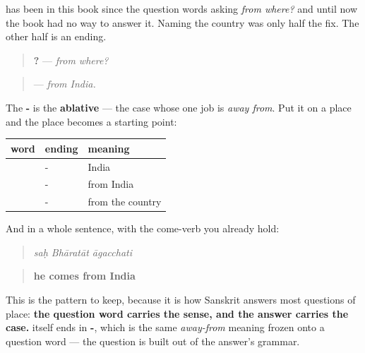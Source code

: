 \begin{grammarlens}[title={Grammar Lens: the ending that answers the question}]
\textbf{} has been in this book since the question words asking \emph{from where?} and until now the book had no way to answer it. Naming the country was only half the fix. The other half is an ending.

\begin{quote}
\textbf{?} — \emph{from where?}
\end{quote}

\begin{quote}
\textbf{} — \emph{from India.}
\end{quote}

The \textbf{-} is the \textbf{ablative} — the case whose one job is \emph{away from}. Put it on a place and the place becomes a starting point:

\noindent
\begin{tabularx}{\linewidth}{@{}>{\raggedright\arraybackslash}X>{\raggedright\arraybackslash}X>{\raggedright\arraybackslash}X@{}}
\toprule
\textbf{word} & \textbf{ending} & \textbf{meaning} \\
\midrule
\textbf{\sk{भारतम्}} & -\sk{अम्} & India \\
\textbf{\sk{भारतात्}} & -\sk{आत्} & from India \\
\textbf{\sk{देशात्}} & -\sk{आत्} & from the country \\
\bottomrule
\end{tabularx}

And in a whole sentence, with the come-verb you already hold:

\begin{quote}
\textbf{  }
\end{quote}

\begin{quote}
\emph{saḥ Bhāratāt āgacchati}
\end{quote}

\begin{quote}
\textbf{he comes from India}
\end{quote}

This is the pattern to keep, because it is how Sanskrit answers most questions of place: \textbf{the question word carries the sense, and the answer carries the case.} \textbf{} itself ends in \textbf{-}, which is the same \emph{away-from} meaning frozen onto a question word — the question is built out of the answer's grammar.
\end{grammarlens}

